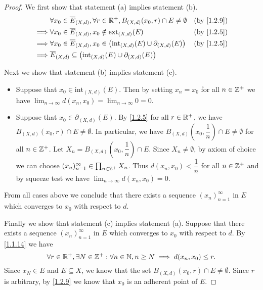 \begin{proof}
  We first show that statement (a) implies statement (b).
  \begin{align*}
             & \forall x_0 \in \overline{E}_{(X, d)}, \forall r \in \R^+, B_{(X, d)}(x_0, r) \cap E \neq \emptyset       &  & \by{1.2.9} \\
    \implies & \forall x_0 \in \overline{E}_{(X, d)}, x_0 \notin \text{ext}_{(X, d)}(E)                                  &  & \by{1.2.5} \\
    \implies & \forall x_0 \in \overline{E}_{(X, d)}, x_0 \in \big(\text{int}_{(X, d)}(E) \cup \partial_{(X, d)}(E)\big) &  & \by{1.2.5} \\
    \implies & \overline{E}_{(X, d)} \subseteq \big(\text{int}_{(X, d)}(E) \cup \partial_{(X, d)}(E)\big)
  \end{align*}

  Next we show that statement (b) implies statement (c).
  \begin{itemize}
    \item Suppose that \(x_0 \in \text{int}_{(X, d)}(E)\).
          Then by setting \(x_n = x_0\) for all \(n \in \mathbb{Z}^+\) we have \(\lim_{n \to \infty} d(x_n, x_0) = \lim_{n \to \infty} 0 = 0\).
    \item Suppose that \(x_0 \in \partial_{(X, d)}(E)\).
          By \cref{1.2.5} for all \(r \in \mathbb{R}^+\), we have \(B_{(X, d)}(x_0, r) \cap E \neq \emptyset\).
          In particular, we have \(B_{(X, d)}(x_0, \dfrac{1}{n}) \cap E \neq \emptyset\) for all \(n \in \mathbb{Z}^+\).
          Let \(X_n = B_{(X, d)}(x_0, \dfrac{1}{n}) \cap E\).
          Since \(X_n \neq \emptyset\), by axiom of choice we can choose \((x_n)_{n = 1}^\infty \in \prod_{n \in \mathbb{Z}^+} X_n\).
          Thus \(d(x_n, x_0) < \dfrac{1}{n}\) for all \(n \in \mathbb{Z}^+\) and by squeeze test we have \(\lim_{n \to \infty} d(x_n, x_0) = 0\).
  \end{itemize}
  From all cases above we conclude that there exists a sequence \((x_n)_{n = 1}^\infty\) in \(E\) which converges to \(x_0\) with respect to \(d\).

  Finally we show that statement (c) implies statement (a).
  Suppose that there exists a sequence \((x_n)_{n = 1}^\infty\) in \(E\) which converges to \(x_0\) with respect to \(d\).
  By \cref{1.1.14} we have
  \[
    \forall r \in \mathbb{R}^+, \exists N \in \mathbb{Z}^+ : \forall n \in \mathbb{N}, n \geq N \implies d(x_n, x_0) \leq r.
  \]
  Since \(x_N \in E\) and \(E \subseteq X\), we know that the set \(B_{(X, d)}(x_0, r) \cap E \neq \emptyset\).
  Since \(r\) is arbitrary, by \cref{1.2.9} we know that \(x_0\) is an adherent point of \(E\).
\end{proof}

